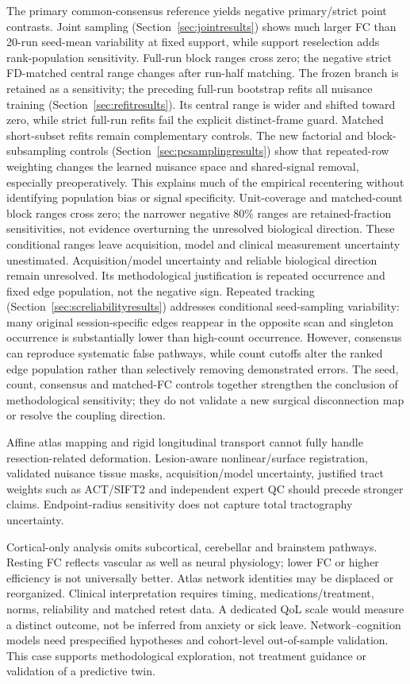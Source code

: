 \documentclass[11pt,a4paper]{article}
\begin{document}
The primary common-consensus reference yields negative primary/strict point contrasts. Joint sampling (Section~\ref{sec:jointresults}) shows much larger FC than 20-run seed-mean variability at fixed support, while support reselection adds rank-population sensitivity. Full-run block ranges cross zero; the negative strict FD-matched central range changes after run-half matching. The frozen branch is retained as a sensitivity; the preceding full-run bootstrap refits all nuisance training (Section~\ref{sec:refitresults}). Its central range is wider and shifted toward zero, while strict full-run refits fail the explicit distinct-frame guard. Matched short-subset refits remain complementary controls. The new factorial and block-subsampling controls (Section~\ref{sec:pcsamplingresults}) show that repeated-row weighting changes the learned nuisance space and shared-signal removal, especially preoperatively. This explains much of the empirical recentering without identifying population bias or signal specificity. Unit-coverage and matched-count block ranges cross zero; the narrower negative 80\% ranges are retained-fraction sensitivities, not evidence overturning the unresolved biological direction. These conditional ranges leave acquisition, model and clinical measurement uncertainty unestimated. Acquisition/model uncertainty and reliable biological direction remain unresolved. Its methodological justification is repeated occurrence and fixed edge population, not the negative sign. Repeated tracking (Section~\ref{sec:screliabilityresults}) addresses conditional seed-sampling variability: many original session-specific edges reappear in the opposite scan and singleton occurrence is substantially lower than high-count occurrence. However, consensus can reproduce systematic false pathways, while count cutoffs alter the ranked edge population rather than selectively removing demonstrated errors. The seed, count, consensus and matched-FC controls together strengthen the conclusion of methodological sensitivity; they do not validate a new surgical disconnection map or resolve the coupling direction.

Affine atlas mapping and rigid longitudinal transport cannot fully handle resection-related deformation. Lesion-aware nonlinear/surface registration, validated nuisance tissue masks, acquisition/model uncertainty, justified tract weights such as ACT/SIFT2 and independent expert QC should precede stronger claims. Endpoint-radius sensitivity does not capture total tractography uncertainty.

Cortical-only analysis omits subcortical, cerebellar and brainstem pathways. Resting FC reflects vascular as well as neural physiology; lower FC or higher efficiency is not universally better. Atlas network identities may be displaced or reorganized. Clinical interpretation requires timing, medications/treatment, norms, reliability and matched retest data. A dedicated QoL scale would measure a distinct outcome, not be inferred from anxiety or sick leave. Network--cognition models need prespecified hypotheses and cohort-level out-of-sample validation. This case supports methodological exploration, not treatment guidance or validation of a predictive twin.
\end{document}
